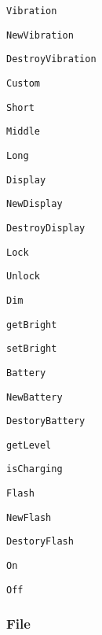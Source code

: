 \begin{DoxyItemize}
\item {\tt Vibration}
\begin{DoxyItemize}
\item {\tt New\-Vibration}
\item {\tt Destroy\-Vibration}
\item {\tt Custom}
\item {\tt Short}
\item {\tt Middle}
\item {\tt Long}
\end{DoxyItemize}
\item {\tt Display}
\begin{DoxyItemize}
\item {\tt New\-Display}
\item {\tt Destroy\-Display}
\item {\tt Lock}
\item {\tt Unlock}
\item {\tt Dim}
\item {\tt get\-Bright}
\item {\tt set\-Bright}
\end{DoxyItemize}
\item {\tt Battery}
\begin{DoxyItemize}
\item {\tt New\-Battery}
\item {\tt Destory\-Battery}
\item {\tt get\-Level}
\item {\tt is\-Charging}
\end{DoxyItemize}
\item {\tt Flash}
\begin{DoxyItemize}
\item {\tt New\-Flash}
\item {\tt Destory\-Flash}
\item {\tt On}
\item {\tt Off}
\end{DoxyItemize}
\end{DoxyItemize}

\subsubsection*{File}


